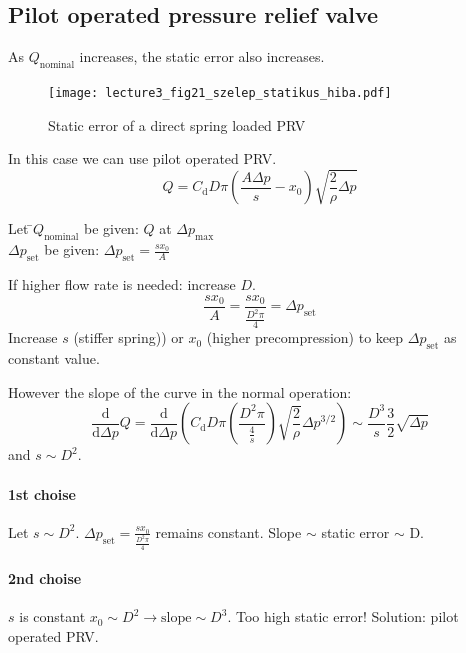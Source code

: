 \subsection{Pilot operated pressure relief valve}
As $Q_{\mathrm{nominal}}$ increases, the static error also increases.
\begin{figure}[tbh]
\begin{center}
\texttt{[image: lecture3\_fig21\_szelep\_statikus\_hiba.pdf]}
\caption{\label{fig:static_error_of_PRV}Static error of a direct spring loaded PRV}
\end{center}
\end{figure}
In this case we can use pilot operated PRV.
\begin{equation}
Q=C_{\mathrm{d}}D\pi\left(\frac{A\Delta p}{s}-x_{\mathrm{0}}\right)\sqrt{\frac{2}{\rho}\Delta p}
\end{equation}
\begin{tabbing}
Let \=$Q_{\mathrm{nominal}}$ be given: $Q$ at $\Delta p_{\mathrm{max}}$ \\
\> $\Delta p_{\mathrm{set}}$ be given: $\Delta p_{\mathrm{set}}=\frac{sx_{\mathrm{0}}}{A}$
\end{tabbing}
If higher flow rate is needed: increase $D$.
\begin{equation}
\frac{sx_{\mathrm{0}}}{A}=\frac{sx_{\mathrm{0}}}{\frac{D^2\pi}{4}}=\Delta p_{\mathrm{set}}
\end{equation}
Increase $s$ (stiffer spring)) or $x_{\mathrm{0}}$ (higher precompression) to keep $\Delta p_{\mathrm{set}}$ as constant value.

However the slope of the curve in the normal operation:
\begin{equation}
\frac{\mathrm{d}}{\mathrm{d}\Delta p}Q=\frac{\mathrm{d}}{\mathrm{d}\Delta p}\left(C_{\mathrm{d}}D\pi\left(\frac{D^2\pi}{\frac{4}{s}}\right)\sqrt{\frac{2}{\rho}}\Delta p^{3/2}\right)\sim \frac{D^3}{s}\frac{3}{2}\sqrt{\Delta p}
\end{equation}
and $s \sim D^2$.
\paragraph{1st choise}
Let $s \sim D^2$. $\Delta p_{\mathrm{set}}=\frac{sx_{\mathrm{0}}}{\frac{D^2\pi}{4}}$ remains constant.
Slope $\sim$ static error $\sim$ D.
\paragraph{2nd choise}
$s$ is constant $x_{\mathrm{0}} \sim D^2 \rightarrow \mathrm{slope} \sim D^3$.
Too high static error! Solution: pilot operated PRV.

